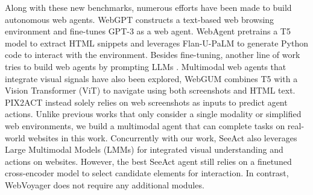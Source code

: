 \documentclass[11pt]{article}
\begin{document}
Along with these new benchmarks, numerous efforts have been made to build autonomous web agents. WebGPT \citep{nakano2021webgpt} constructs a text-based web browsing environment and fine-tunes GPT-3 as a web agent. WebAgent \citep{gur2023real} pretrains a T5 model to extract HTML snippets and leverages Flan-U-PaLM \citep{chowdhery2023palm} to generate Python code to interact with the environment. Besides fine-tuning, another line of work tries to build web agents by prompting LLMs \cite{yao2022react, shinn2023reflexion, ma2023laser}. %
Multimodal web agents that integrate visual signals have also been explored, WebGUM \citep{furuta2023multimodal} combines T5 \citep{raffel2020exploring} with a Vision Transformer (ViT) to navigate using both screenshots and HTML text. PIX2ACT \citep{shaw2023pixels} instead solely relies on web screenshots as inputs to predict agent actions. Unlike previous works that only consider a single modality or simplified web environments, we build a multimodal agent that can complete tasks on real-world websites in this work.
Concurrently with our work, SeeAct \citep{zheng2024gpt} also leverages Large Multimodal Models (LMMs) for integrated visual understanding and actions on websites. However, the best SeeAct agent still relies on a finetuned cross-encoder model to select candidate elements for interaction. In contrast, WebVoyager does not require any additional modules.  
\end{document}
